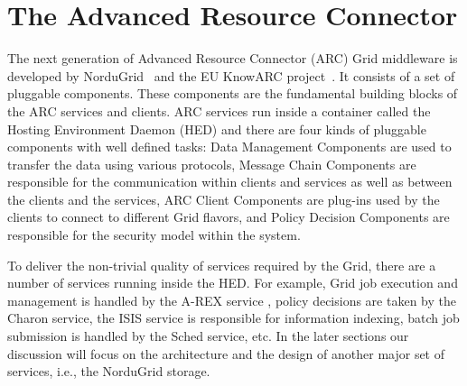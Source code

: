 \documentclass[final]{ieee}
\begin{document}







\section{The Advanced Resource Connector}
\label{The Advance Resource Connector}

The next generation of Advanced Resource Connector (ARC) Grid middleware is
developed by NorduGrid~\cite{NorduGridsite} and the EU KnowARC
 project~\cite{KnowARCsite}. It consists of a set of pluggable 
components. These components are the
fundamental building blocks of the ARC services and clients. ARC
services run inside a container called the Hosting Environment
Daemon (HED) and there are four kinds of pluggable components with well
defined tasks: Data Management Components are used to transfer the
data using various protocols, Message Chain Components are
responsible for the communication within clients and services as well as
between the clients and the services, ARC Client Components are
plug-ins used by the clients to connect to different Grid flavors, and
Policy Decision Components are responsible for the security model
within the system.

To deliver the non-trivial quality of services required by the Grid,
there are a number of services running inside the HED. For example, Grid
job execution and management is handled by the A-REX service 
\cite{AREXdesigndoc}, policy
decisions are taken by the Charon service, the ISIS service is
responsible for information indexing, batch job submission is
handled by the Sched service, etc. In the later sections our discussion
will focus on the architecture and the design of another major set
of services, i.e., the NorduGrid storage. 
\end{document}
